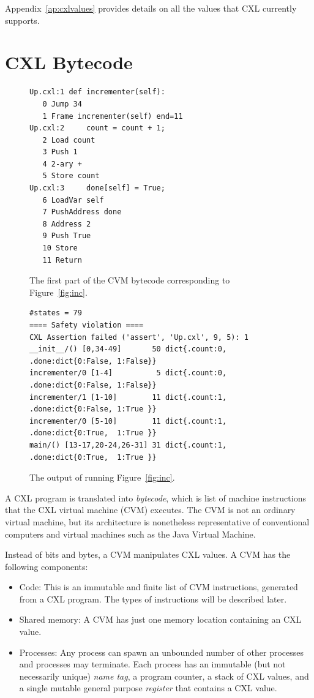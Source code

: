 \documentclass{report}
\newenvironment{code}{
\tcolorbox
}{
\endtcolorbox
}
\begin{document}
Appendix~\ref{ap:cxlvalues} provides details on all the values that
CXL currently supports.

\section*{CXL Bytecode}

\begin{figure}
\begin{code}
\begin{verbatim}
Up.cxl:1 def incrementer(self):
   0 Jump 34
   1 Frame incrementer(self) end=11
Up.cxl:2     count = count + 1;
   2 Load count
   3 Push 1
   4 2-ary +
   5 Store count
Up.cxl:3     done[self] = True;
   6 LoadVar self
   7 PushAddress done
   8 Address 2
   9 Push True
   10 Store
   11 Return
\end{verbatim}
\end{code}
\caption{The first part of the CVM bytecode corresponding to Figure~\ref{fig:inc}.}
\label{fig:inccode}
\end{figure}

\begin{figure}
\begin{code}
\begin{verbatim}
#states = 79
==== Safety violation ====
CXL Assertion failed ('assert', 'Up.cxl', 9, 5): 1
__init__/() [0,34-49]       50 dict{.count:0, .done:dict{0:False, 1:False}}
incrementer/0 [1-4]          5 dict{.count:0, .done:dict{0:False, 1:False}}
incrementer/1 [1-10]        11 dict{.count:1, .done:dict{0:False, 1:True }}
incrementer/0 [5-10]        11 dict{.count:1, .done:dict{0:True,  1:True }}
main/() [13-17,20-24,26-31] 31 dict{.count:1, .done:dict{0:True,  1:True }}
\end{verbatim}
\end{code}
\caption{The output of running Figure~\ref{fig:inc}.}
\label{fig:incoutput}
\end{figure}

A CXL program is translated
into \emph{bytecode}, which is list of machine instructions that the
CXL virtual machine (CVM) executes.
The CVM is not an ordinary virtual machine, but its architecture
is nonetheless representative of conventional computers and
virtual machines such as the Java Virtual Machine.

Instead of bits and bytes, a CVM manipulates CXL values.
A CVM has the following components:
\begin{itemize}
\item Code:  This is an immutable and finite list of CVM instructions,
generated from a CXL program.  The types of instructions will be described later.
\item Shared memory: A CVM has just one memory location containing
an CXL value.
\item Processes:  Any process
can spawn an unbounded number of other processes and processes may terminate.
Each process has an immutable (but not necessarily unique) \emph{name tag},
a program counter,
a stack of CXL values,
and a single mutable general purpose \emph{register}
that contains a CXL value.
\end{itemize}
\end{document}
